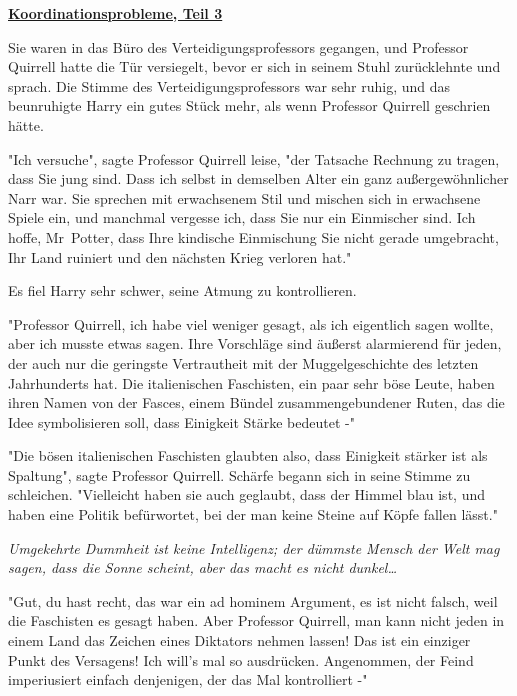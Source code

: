 

\hypertarget{koordinationsprobleme-teil-3}{%

\textbf{\uline{Koordinationsprobleme, Teil 3}}

Sie waren in das Büro des Verteidigungsprofessors gegangen, und Professor Quirrell hatte die Tür versiegelt, bevor er sich in seinem Stuhl zurücklehnte und sprach. Die Stimme des Verteidigungsprofessors war sehr ruhig, und das beunruhigte Harry ein gutes Stück mehr, als wenn Professor Quirrell geschrien hätte.

"Ich versuche", sagte Professor Quirrell leise, "der Tatsache Rechnung zu tragen, dass Sie jung sind. Dass ich selbst in demselben Alter ein ganz außergewöhnlicher Narr war. Sie sprechen mit erwachsenem Stil und mischen sich in erwachsene Spiele ein, und manchmal vergesse ich, dass Sie nur ein Einmischer sind. Ich hoffe, Mr~Potter, dass Ihre kindische Einmischung Sie nicht gerade umgebracht, Ihr Land ruiniert und den nächsten Krieg verloren hat."

Es fiel Harry sehr schwer, seine Atmung zu kontrollieren.

"Professor Quirrell, ich habe viel weniger gesagt, als ich eigentlich sagen wollte, aber ich musste etwas sagen. Ihre Vorschläge sind äußerst alarmierend für jeden, der auch nur die geringste Vertrautheit mit der Muggelgeschichte des letzten Jahrhunderts hat. Die italienischen Faschisten, ein paar sehr böse Leute, haben ihren Namen von der Fasces, einem Bündel zusammengebundener Ruten, das die Idee symbolisieren soll, dass Einigkeit Stärke bedeutet -"

"Die bösen italienischen Faschisten glaubten also, dass Einigkeit stärker ist als Spaltung", sagte Professor Quirrell. Schärfe begann sich in seine Stimme zu schleichen. "Vielleicht haben sie auch geglaubt, dass der Himmel blau ist, und haben eine Politik befürwortet, bei der man keine Steine auf Köpfe fallen lässt."

\emph{Umgekehrte Dummheit ist keine Intelligenz; der dümmste Mensch der Welt mag sagen, dass die Sonne scheint, aber das macht es nicht dunkel…}

"Gut, du hast recht, das war ein ad hominem Argument, es ist nicht falsch, weil die Faschisten es gesagt haben. Aber Professor Quirrell, man kann nicht jeden in einem Land das Zeichen eines Diktators nehmen lassen! Das ist ein einziger Punkt des Versagens! Ich will's mal so ausdrücken. Angenommen, der Feind imperiusiert einfach denjenigen, der das Mal kontrolliert -"

}

